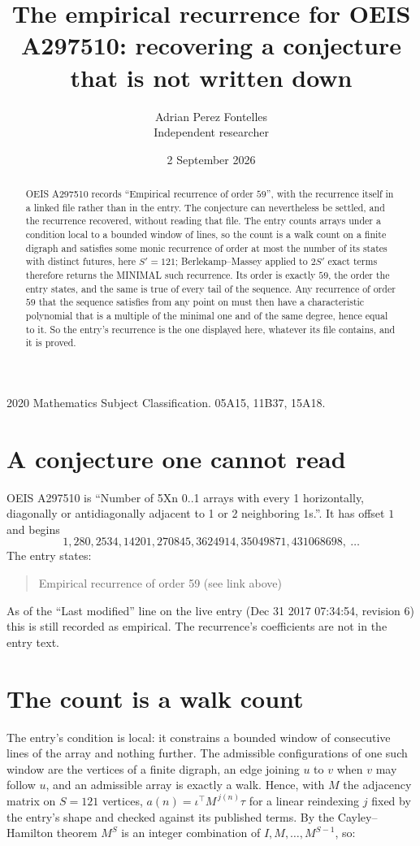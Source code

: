 \documentclass[11pt,a4paper]{article}
\title{The empirical recurrence for OEIS A297510: recovering a conjecture that is not written down}
\author{Adrian Perez Fontelles\\ \small Independent researcher}
\date{2 September 2026}
\theoremstyle{plain}
\theoremstyle{definition}
\begin{document}
\maketitle

\begin{abstract}
OEIS A297510 records ``Empirical recurrence of order $59$'', with the recurrence itself in a
linked file rather than in the entry. The conjecture can nevertheless be settled, and the
recurrence recovered, without reading that file. The entry counts arrays under a condition
local to a bounded window of lines, so the count is a walk count on a finite digraph and
satisfies some monic recurrence of order at most the number of its states with distinct
futures, here $S'=121$; Berlekamp--Massey applied to $2S'$ exact
terms therefore returns the MINIMAL such recurrence. Its order is exactly $59$, the order
the entry states, and the same is true of every tail of the sequence. Any recurrence of order
$59$ that the sequence satisfies from any point on must then have a characteristic
polynomial that is a multiple of the minimal one and of the same degree, hence equal to it. So
the entry's recurrence is the one displayed here, whatever its file contains, and it is
proved.
\end{abstract}

\noindent\small 2020 Mathematics Subject Classification. 05A15, 11B37, 15A18.\normalsize

\section{A conjecture one cannot read}

OEIS A297510 is ``Number of 5Xn 0..1 arrays with every 1 horizontally, diagonally or antidiagonally adjacent to 1 or 2 neighboring 1s.''. It has offset $1$ and begins
\[
1, 280, 2534, 14201, 270845, 3624914, 35049871, 431068698,\ \dots
\]
The entry states:
\begin{quote}
Empirical recurrence of order 59 (see link above)
\end{quote}
As of the ``Last modified'' line on the live entry (Dec 31 2017 07:34:54, revision 6) this is still
recorded as empirical. The recurrence's coefficients are not in the entry text.

\section{The count is a walk count}

The entry's condition is local: it constrains a bounded window of consecutive lines of the
array and nothing further. The admissible configurations of one such window are the vertices
of a finite digraph, an edge joining $u$ to $v$ when $v$ may follow $u$, and an admissible
array is exactly a walk. Hence, with $M$ the adjacency matrix on $S=121$ vertices,
$a(n)=\iota^{\!\top}M^{\,j(n)}\tau$ for a linear reindexing $j$ fixed by the entry's shape
and checked against its published terms. By the Cayley--Hamilton theorem $M^{S}$ is an
integer combination of $I,M,\dots,M^{S-1}$, so:
\end{document}

